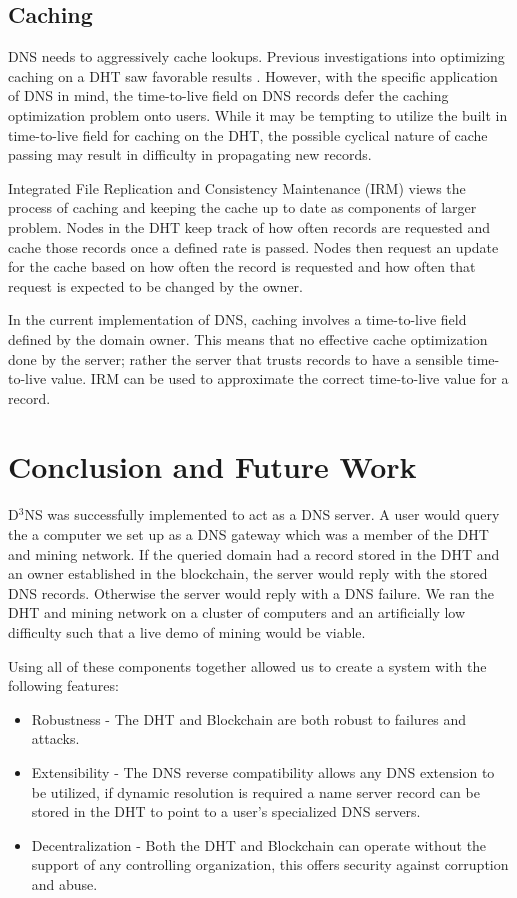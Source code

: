 \subsection{Caching}
DNS needs to aggressively cache lookups. Previous investigations into optimizing caching on a DHT saw favorable results \cite{irm}. However, with the specific application of DNS in mind, the time-to-live field on DNS records defer the caching optimization problem onto users. 
While it may be tempting to utilize the built in time-to-live field for caching on the DHT, the possible cyclical nature of cache passing may result in difficulty in propagating new records.


Integrated File Replication and Consistency Maintenance (IRM) \cite{irm} views the process of caching and keeping the cache up to date as components of larger problem.  Nodes in the DHT keep track of how often records are requested and cache those records once a defined rate is passed.  Nodes then request an update for the cache based on how often the record is requested and how often that request is expected to be changed by the owner.


In the current implementation of DNS, caching involves a time-to-live field defined by the domain owner. This means that no effective cache optimization done by the server; rather the server that trusts records to have a sensible time-to-live value. IRM \cite{irm} can be used to approximate the correct time-to-live value for a record.

\section{Conclusion and Future Work}
D$^3$NS was successfully implemented to act as a DNS server.  A user would query the a computer we set up as a DNS gateway which was a member of the DHT and mining network. If the queried domain had a record stored in the DHT and an owner established in the blockchain, the server would reply with the stored DNS records. Otherwise the server would reply with a DNS failure. We ran the DHT and mining network on a cluster of computers and an artificially low difficulty such that a live demo of mining would be viable.

Using all of these components together allowed us to create a system with the following features:
\begin{itemize}
	\item Robustness - The DHT and Blockchain are both robust to failures and attacks.
	\item Extensibility - The DNS reverse compatibility allows any DNS extension to be utilized, if dynamic resolution is required a name server record can be stored in the DHT to point to a user's specialized DNS servers.
	\item Decentralization - Both the DHT and Blockchain can operate without the support of any controlling organization, this offers security against corruption and abuse. 
\end{itemize}	

